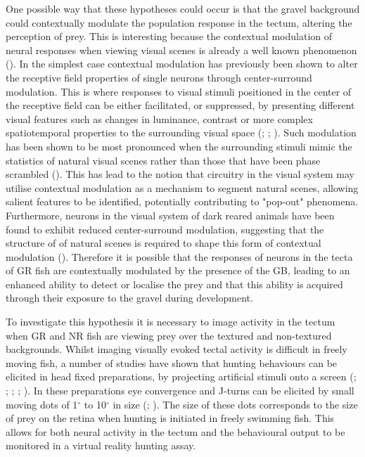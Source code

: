 One possible way that these hypotheses could occur is that the gravel background could contextually modulate the population response in the tectum, altering the perception of prey. This is interesting because the contextual modulation of neural responses when viewing visual scenes is already a well known phenomenon (\cite{Spillmann2015BeyondStimuli}). In the simplest case contextual modulation has previously been shown to alter the receptive field properties of single neurons through center-surround modulation. This is where responses to visual stimuli positioned in the center of the receptive field can be either facilitated, or suppressed, by presenting different visual features such as changes in luminance, contrast or more complex spatiotemporal properties to the surrounding visual space (\cite{Krause2014ContextualCortex}; \cite{Sun2002ContextualPigeons}; \cite{Huang2019NeuralCircuit}). Such modulation has been shown to be most pronounced when the surrounding stimuli mimic the statistics of natural visual scenes rather than those that have been phase scrambled (\cite{Guo2005Centre-surroundCortex}). This has lead to the notion that circuitry in the visual system may utilise contextual modulation as a mechanism to segment natural scenes, allowing salient features to be identified, potentially contributing to "pop-out" phenomena. Furthermore, neurons in the visual system of dark reared animals have been found to exhibit reduced center-surround modulation, suggesting that the structure of of natural scenes is required to shape this form of contextual modulation  (\cite{Pecka2014Experience-DependentScenes}). Therefore it is possible that the responses of neurons in the tecta of GR fish are contextually modulated by the presence of the GB, leading to an enhanced ability to detect or localise the prey and that this ability is acquired through their exposure to the gravel during development. 

To investigate this hypothesis it is necessary to image activity in the tectum when GR and NR fish are viewing prey over the textured and non-textured backgrounds. Whilst imaging visually evoked tectal activity is difficult in freely moving fish, a number of studies have shown that hunting behaviours can be elicited in head fixed preparations, by projecting artificial stimuli onto a screen (\cite{Bianco2011}; \cite{Trivedi2013VisuallyCapture}; \cite{Semmelhack2014}; \cite{Bianco2015}; \cite{Jouary2016ALarvae}). In these preparations eye convergence and J-turns can be elicited by small moving dots of 1$^{\circ}$ to 10$^{\circ}$ in size (\cite{Bianco2015}; \cite{Semmelhack2014}). The size of these dots corresponds to the size of prey on the retina when hunting is initiated in freely swimming fish. This allows for both neural activity in the tectum and the behavioural output to be monitored in a virtual reality hunting assay.

